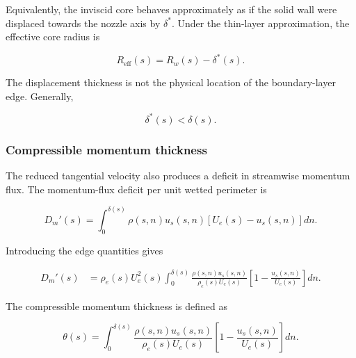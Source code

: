 Equivalently, the inviscid core behaves approximately as if the solid wall
were displaced towards the nozzle axis by \(\delta^*\). Under the thin-layer
approximation, the effective core radius is

\begin{equation}
    \boxed{
    R_{\mathrm{eff}}(s)
    =
    R_w(s)-\delta^*(s)
    }.
    \label{eq:effective_radius_displacement}
\end{equation}

The displacement thickness is not the physical location of the
boundary-layer edge. Generally,

\begin{equation}
    \delta^*(s)<\delta(s).
    \label{eq:displacement_less_than_delta}
\end{equation}

\subsubsection{Compressible momentum thickness}

The reduced tangential velocity also produces a deficit in streamwise
momentum flux. The momentum-flux deficit per unit wetted perimeter is

\begin{equation}
    D_m'(s)
    =
    \int_0^{\delta(s)}
    \rho(s,n)u_s(s,n)
    \left[
        U_e(s)-u_s(s,n)
    \right]dn.
    \label{eq:momentum_deficit_integral}
\end{equation}

Introducing the edge quantities gives

\begin{equation}
\begin{split}
    D_m'(s)
    &=
    \rho_e(s)U_e^2(s)
    \int_0^{\delta(s)}
    \frac{
        \rho(s,n)u_s(s,n)
    }{
        \rho_e(s)U_e(s)
    }
    \left[
        1-
        \frac{
            u_s(s,n)
        }{
            U_e(s)
        }
    \right]dn.
\end{split}
\label{eq:momentum_deficit_normalized}
\end{equation}

The compressible momentum thickness is defined as

\begin{equation}
    \boxed{
    \theta(s)
    =
    \int_0^{\delta(s)}
    \frac{
        \rho(s,n)u_s(s,n)
    }{
        \rho_e(s)U_e(s)
    }
    \left[
        1-
        \frac{
            u_s(s,n)
        }{
            U_e(s)
        }
    \right]dn
    }.
    \label{eq:compressible_momentum_thickness}
\end{equation}

